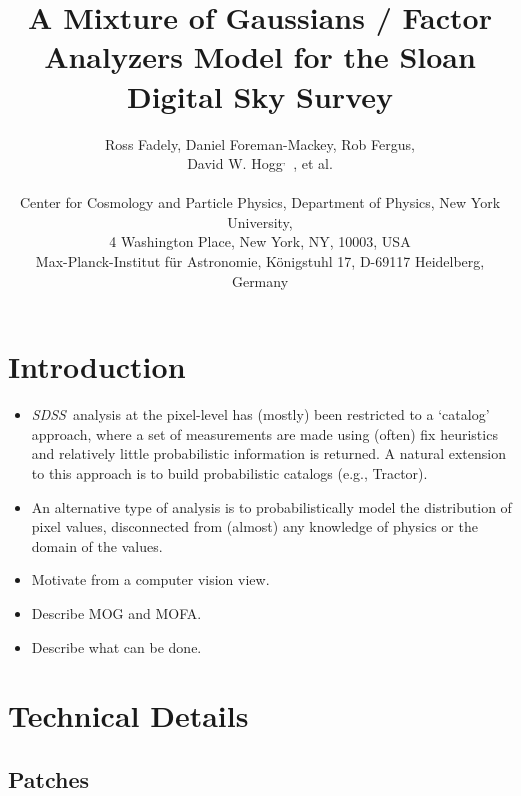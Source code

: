 \documentclass[letterpaper,12pt]{article}
\title{A Mixture of Gaussians / Factor Analyzers Model for the Sloan Digital Sky Survey}
\author{Ross Fadely\nyu, Daniel Foreman-Mackey\nyu, Rob Fergus\nyu, \\ 
David W. Hogg\nyu$^,$\mpia~,  et al. \\
\\
\small
\nyu Center for Cosmology and Particle Physics,
                        Department of Physics, New York University,\\ \small
                        4 Washington Place, New York, NY, 10003, USA \\
\small\mpia Max-Planck-Institut f\"ur Astronomie,
                        K\"onigstuhl 17, D-69117 Heidelberg, Germany \\
}
\newcommand{\sdss}{{\it SDSS}}
\begin{document}
\maketitle

\begin{abstract}
\end{abstract}

\section{Introduction}

\begin{itemize}


\item \sdss\, analysis at the pixel-level has (mostly) been restricted to 
a `catalog' approach, where a set of measurements are made using 
(often) fix heuristics and relatively little probabilistic information is returned.  
A natural extension to this approach is to build probabilistic catalogs (e.g., 
Tractor).

\item An alternative type of analysis is to probabilistically model the distribution 
of pixel values, disconnected from (almost) any knowledge of physics or the 
domain of the values.  

\item Motivate from a computer vision view.

\item Describe MOG and MOFA.

\item Describe what can be done.


\end{itemize}

\section{Technical Details}

\subsection{Patches}
\end{document}
